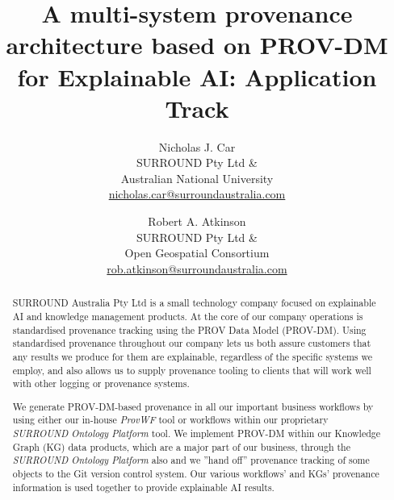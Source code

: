\documentclass[letterpaper,twocolumn,10pt]{article}
\begin{document}

\date{}

\title{\Large \bf A multi-system provenance architecture based on PROV-DM for Explainable AI: Application Track}

\author{
{\rm Nicholas J. Car}\\
SURROUND Pty Ltd \&\\
Australian National University\\
\href{mailto:nicholas.car@surroundaustralia.com}{nicholas.car@surroundaustralia.com} 
\and
{\rm Robert A. Atkinson}\\
SURROUND Pty Ltd \&\\
Open Geospatial Consortium\\
\href{mailto:rob.atkinson@surroundaustralia.com}{rob.atkinson@surroundaustralia.com} 
} %

\maketitle

\begin{abstract}

SURROUND Australia Pty Ltd is a small technology company focused on explainable 
AI and knowledge management products. At the core of our company operations is 
standardised provenance tracking using the PROV Data Model (PROV-DM). Using standardised 
provenance throughout our company lets us both assure customers that any results 
we produce for them are explainable, regardless of the specific systems we employ, 
and also allows us to supply provenance tooling to clients that will work well 
with other logging or provenance systems.

We generate PROV-DM-based provenance in all our important business workflows by 
using either our in-house \textit{ProvWF} tool or workflows within our 
proprietary \textit{SURROUND Ontology Platform} tool. We implement PROV-DM within our 
Knowledge Graph (KG) data products, which are a major part of our business, through the 
\textit{SURROUND Ontology Platform} also and we ''hand off'' provenance tracking 
of some objects to the Git version control system. Our various workflows' and KGs' provenance
information is used together to provide explainable AI results.
\end{abstract}
\end{document}
